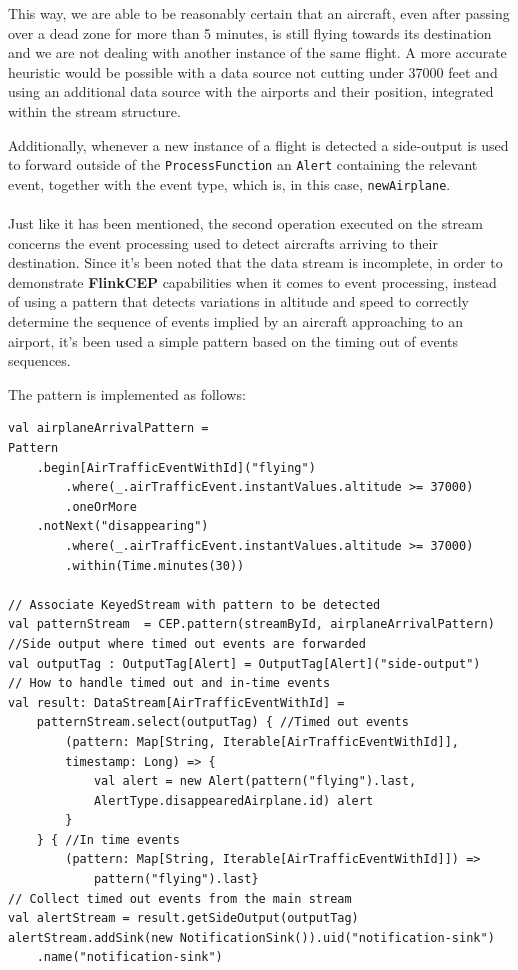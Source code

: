 This way, we are able to be reasonably certain that an aircraft, even after passing over a dead zone for more than 5 minutes, is still flying towards its destination and we are not dealing with another instance of the same flight. A more accurate heuristic would be possible with a data source not cutting under 37000 feet and using an additional data source with the airports and their position, integrated within the stream structure.

Additionally, whenever a new instance of a flight is detected a side-output is used to forward outside of the \texttt{ProcessFunction} an \texttt{Alert} containing the relevant event, together with the event type, which is, in this case, \texttt{newAirplane}.
\\ \\
Just like it has been mentioned, the second operation executed on the stream concerns the event processing used to detect aircrafts arriving to their destination. Since it's been noted that the data stream is incomplete, in order to demonstrate \textbf{FlinkCEP} capabilities when it comes to event processing, instead of using a pattern that detects variations in altitude and speed to correctly determine the sequence of events implied by an aircraft approaching to an airport, it's been used a simple pattern based on the timing out of events sequences.

\pagebreak

The pattern is implemented as follows:
\\
\begin{verbatim}
val airplaneArrivalPattern = 
Pattern
    .begin[AirTrafficEventWithId]("flying")
        .where(_.airTrafficEvent.instantValues.altitude >= 37000)
        .oneOrMore
    .notNext("disappearing")
        .where(_.airTrafficEvent.instantValues.altitude >= 37000)
        .within(Time.minutes(30))

// Associate KeyedStream with pattern to be detected
val patternStream  = CEP.pattern(streamById, airplaneArrivalPattern)
//Side output where timed out events are forwarded
val outputTag : OutputTag[Alert] = OutputTag[Alert]("side-output")
// How to handle timed out and in-time events
val result: DataStream[AirTrafficEventWithId] = 
    patternStream.select(outputTag) { //Timed out events
        (pattern: Map[String, Iterable[AirTrafficEventWithId]], 
        timestamp: Long) => {
            val alert = new Alert(pattern("flying").last, 
            AlertType.disappearedAirplane.id) alert
        }
    } { //In time events
        (pattern: Map[String, Iterable[AirTrafficEventWithId]]) =>
            pattern("flying").last}   
// Collect timed out events from the main stream
val alertStream = result.getSideOutput(outputTag)
alertStream.addSink(new NotificationSink()).uid("notification-sink")
    .name("notification-sink")
\end{verbatim}

